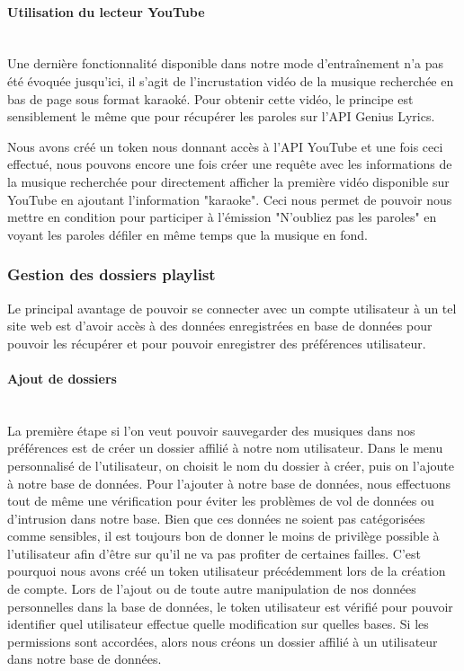 \documentclass[12pt,french]{article}
\begin{document}
\paragraph{Utilisation du lecteur YouTube \\\\}

Une dernière fonctionnalité disponible dans notre mode d'entraînement n'a pas été évoquée jusqu'ici, il s'agit de l'incrustation vidéo de la musique recherchée en bas de page sous format karaoké. Pour obtenir cette vidéo, le principe est sensiblement le même que pour récupérer les paroles sur l'\gls{API} Genius Lyrics. 

\newpage

\noindent
Nous avons créé un \gls{token} nous donnant accès à l'\gls{API} YouTube et une fois ceci effectué, nous pouvons encore une fois créer une requête avec les informations de la musique recherchée pour directement afficher la première vidéo disponible sur YouTube en ajoutant l'information "karaoke". Ceci nous permet de pouvoir nous mettre en condition pour participer à l'émission "N'oubliez pas les paroles" en voyant les paroles défiler en même temps que la musique en fond.  

\subsubsection{Gestion des dossiers playlist}

Le principal avantage de pouvoir se connecter avec un compte utilisateur à un tel site web est d'avoir accès à des données enregistrées en base de données pour pouvoir les récupérer et pour pouvoir enregistrer des préférences utilisateur.

\paragraph{Ajout de dossiers \\\\}

La première étape si l'on veut pouvoir sauvegarder des musiques dans nos préférences est de créer un dossier affilié à notre nom utilisateur. Dans le menu personnalisé de l'utilisateur, on choisit le nom du dossier à créer, puis on l'ajoute à notre base de données. Pour l'ajouter à notre base de données, nous effectuons tout de même une vérification pour éviter les problèmes de vol de données ou d'intrusion dans notre base. Bien que ces données ne soient pas catégorisées comme sensibles, il est toujours bon de donner le moins de privilège possible à l'utilisateur afin d'être sur qu'il ne va pas profiter de certaines failles. C'est pourquoi nous avons créé un \gls{token} utilisateur précédemment lors de la création de compte. Lors de l'ajout ou de toute autre manipulation de nos données personnelles dans la base de données, le \gls{token} utilisateur est vérifié pour pouvoir identifier quel utilisateur effectue quelle modification sur quelles bases. Si les permissions sont accordées, alors nous créons un dossier affilié à un utilisateur dans notre base de données.
\end{document}
